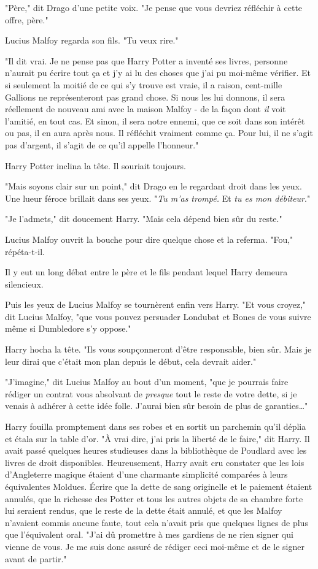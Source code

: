"Père," dit Drago d'une petite voix. "Je pense que vous devriez réfléchir à cette offre, père."

Lucius Malfoy regarda son fils. "Tu veux rire."

"Il dit vrai. Je ne pense pas que Harry Potter a inventé ses livres, personne n'aurait pu écrire tout ça et j'y ai lu des choses que j'ai pu moi-même vérifier. Et si seulement la moitié de ce qui s'y trouve est vraie, il a raison, cent-mille Gallions ne représenteront pas grand chose. Si nous les lui donnons, il sera réellement de nouveau ami avec la maison Malfoy - de la façon dont \emph{il} voit l'amitié, en tout cas. Et sinon, il sera notre ennemi, que ce soit dans son intérêt ou pas, il en aura après nous. Il réfléchit vraiment comme ça. Pour lui, il ne s'agit pas d'argent, il s'agit de ce qu'il appelle l'honneur."

Harry Potter inclina la tête. Il souriait toujours.

"Mais soyons clair sur un point," dit Drago en le regardant droit dans les yeux. Une lueur féroce brillait dans ses yeux. "\emph{Tu m'as trompé.} Et \emph{tu es mon débiteur}."

"Je l'admets," dit doucement Harry. "Mais cela dépend bien sûr du reste."

Lucius Malfoy ouvrit la bouche pour dire quelque chose et la referma. "Fou," répéta-t-il.

Il y eut un long débat entre le père et le fils pendant lequel Harry demeura silencieux.

Puis les yeux de Lucius Malfoy se tournèrent enfin vers Harry. "Et vous croyez," dit Lucius Malfoy, "que vous pouvez persuader Londubat et Bones de vous suivre même si Dumbledore s'y oppose."

Harry hocha la tête. "Ils vous soupçonneront d'être responsable, bien sûr. Mais je leur dirai que c'était mon plan depuis le début, cela devrait aider."

"J'imagine," dit Lucius Malfoy au bout d'un moment, "que je pourrais faire rédiger un contrat vous absolvant de \emph{presque} tout le reste de votre dette, si je venais à adhérer à cette idée folle. J'aurai bien sûr besoin de plus de garanties…"

Harry fouilla promptement dans ses robes et en sortit un parchemin qu'il déplia et étala sur la table d'or. "À vrai dire, j'ai pris la liberté de le faire," dit Harry. Il avait passé quelques heures studieuses dans la bibliothèque de Poudlard avec les livres de droit disponibles. Heureusement, Harry avait cru constater que les lois d'Angleterre magique étaient d'une charmante simplicité comparées à leurs équivalentes Moldues. Écrire que la dette de sang originelle et le paiement étaient annulés, que la richesse des Potter et tous les autres objets de sa chambre forte lui seraient rendus, que le reste de la dette était annulé, et que les Malfoy n'avaient commis aucune faute, tout cela n'avait pris que quelques lignes de plus que l'équivalent oral. "J'ai dû promettre à mes gardiens de ne rien signer qui vienne de vous. Je me suis donc assuré de rédiger ceci moi-même et de le signer avant de partir."

